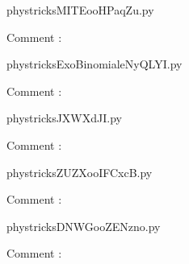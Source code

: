 
    \newcommand{\CaptionFigMITEooHPaqZu}{<+Type your caption here+>}
    \begin{center}
        
    \end{center}
    phystricksMITEooHPaqZu.py

    Comment : 

    \clearpage
    


    \newcommand{\CaptionFigExoBinomialeNyQLYI}{<+Type your caption here+>}
    \begin{center}
        
    \end{center}
    phystricksExoBinomialeNyQLYI.py

    Comment : 

    \clearpage
    


    \newcommand{\CaptionFigJXWXdJI}{<+Type your caption here+>}
    \begin{center}
        
    \end{center}
    phystricksJXWXdJI.py

    Comment : 

    \clearpage
    


    \newcommand{\CaptionFigZUZXooIFCxcB}{<+Type your caption here+>}
    \begin{center}
        
    \end{center}
    phystricksZUZXooIFCxcB.py

    Comment : 

    \clearpage
    


    \newcommand{\CaptionFigDNWGooZENzno}{<+Type your caption here+>}
    \begin{center}
        
    \end{center}
    phystricksDNWGooZENzno.py

    Comment : 

    \clearpage
    


